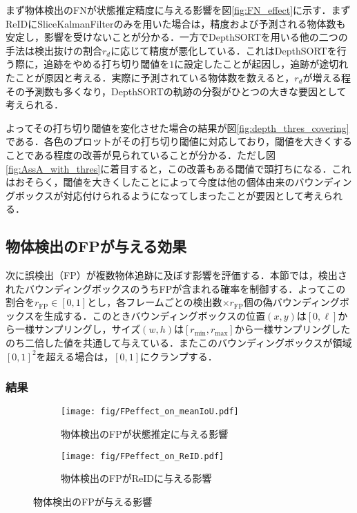     まず物体検出のFNが状態推定精度に与える影響を図\ref{fig:FN_effect}に示す．まずReIDにSliceKalmanFilterのみを用いた場合は，精度および予測される物体数も安定し，影響を受けないことが分かる．一方でDepthSORTを用いる他の二つの手法は検出抜けの割合$r_d$に応じて精度が悪化している．これはDepthSORTを行う際に，追跡をやめる打ち切り閾値を$1$に設定したことが起因し，追跡が途切れたことが原因と考える．実際に予測されている物体数を数えると，$r_d$が増える程その予測数も多くなり，DepthSORTの軌跡の分裂がひとつの大きな要因として考えられる．

    よってその打ち切り閾値を変化させた場合の結果が図\ref{fig:depth_thres_covering}である．各色のプロットがその打ち切り閾値に対応しており，閾値を大きくすることである程度の改善が見られていることが分かる．ただし図\ref{fig:AssA_with_thres}に着目すると，この改善もある閾値で頭打ちになる．これはおそらく，閾値を大きくしたことによって今度は他の個体由来のバウンディングボックスが対応付けられるようになってしまったことが要因として考えられる．

    \subsection{物体検出のFPが与える効果}
    \label{subsec:false_positive_effect}

    次に誤検出（FP）が複数物体追跡に及ぼす影響を評価する．本節では，検出されたバウンディングボックスのうちFPが含まれる確率を制御する．よってこの割合を$r_{\text{FP}} \in [0, 1]$とし，各フレームごとの検出数$\times r_{\text{FP}}$個の偽バウンディングボックスを生成する．このときバウンディングボックスの位置$(x,y)$は$[0, \ell]$から一様サンプリングし，サイズ$(w,h)$は$[r_{\text{min}}, r_{\text{max}}]$から一様サンプリングしたのち二倍した値を共通して与えている．またこのバウンディングボックスが領域$[0, 1]^2$を超える場合は，$[0, 1]$にクランプする．

        \subsubsection{結果}

        \begin{figure}[t]
            \centering
            \begin{subfigure}[t]{\linewidth}
                \centering
                \texttt{[image: fig/FPeffect\_on\_meanIoU.pdf]}
                \caption[物体検出のFPが状態推定に与える影響]{物体検出のFPが状態推定に与える影響}
                \label{fig:FPeffect_on_meanIoU}
            \end{subfigure}
            \begin{subfigure}[t]{0.66\linewidth}
                \centering
                \texttt{[image: fig/FPeffect\_on\_ReID.pdf]}
                \caption[物体検出のFPがReIDに与える影響]{物体検出のFPがReIDに与える影響}
                \label{fig:FPeffect_on_ReID}
            \end{subfigure}
            \caption[物体検出のFPが与える影響]{物体検出のFPが与える影響}
            \label{fig:FPeffect}
        \end{figure}

